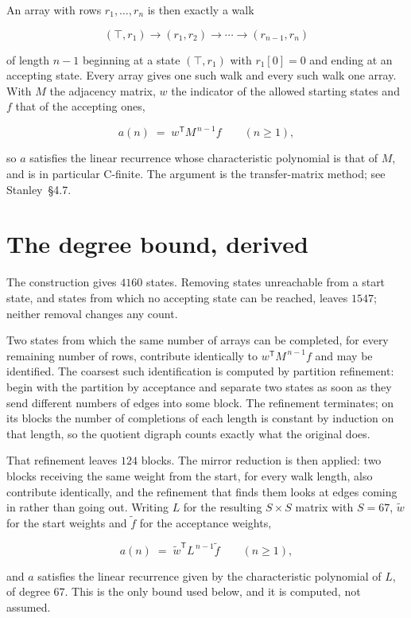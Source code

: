 \documentclass[11pt]{article}
\theoremstyle{definition}
\begin{document}
An array with rows $r_1,\dots,r_n$ is then exactly a walk

\[(\top,r_1) \to (r_1,r_2) \to \cdots \to (r_{n-1},r_n)\]

of length $n-1$ beginning at a state $(\top,r_1)$ with $r_1[0]=0$ and ending at an accepting state. Every array gives one such walk and every such walk one array. With $M$ the adjacency matrix, $w$ the indicator of the allowed starting states and $f$ that of the accepting ones,

\[a(n) \;=\; w^{\mathsf T} M^{\,n-1} f \qquad (n \ge 1),\]

so $a$ satisfies the linear recurrence whose characteristic polynomial is that of $M$, and is in particular C-finite. The argument is the transfer-matrix method; see Stanley~\S4.7.

\section{The degree bound, derived}

The construction gives $4160$ states. Removing states unreachable from a start state, and states from which no accepting state can be reached, leaves $1547$; neither removal changes any count.

Two states from which the same number of arrays can be completed, for every remaining number of rows, contribute identically to $w^{\mathsf T}M^{\,n-1}f$ and may be identified. The coarsest such identification is computed by partition refinement: begin with the partition by acceptance and separate two states as soon as they send different numbers of edges into some block. The refinement terminates; on its blocks the number of completions of each length is constant by induction on that length, so the quotient digraph counts exactly what the original does.

That refinement leaves $124$ blocks. The mirror reduction is then applied: two blocks receiving the same weight from the start, for every walk length, also contribute identically, and the refinement that finds them looks at edges coming in rather than going out. Writing $L$ for the resulting $S \times S$ matrix with $S = 67$, $\tilde w$ for the start weights and $\tilde f$ for the acceptance weights,

\[a(n) \;=\; \tilde w^{\mathsf T} L^{\,n-1} \tilde f \qquad (n \ge 1),\]

and $a$ satisfies the linear recurrence given by the characteristic polynomial of $L$, of degree $67$. This is the only bound used below, and it is computed, not assumed.
\end{document}
